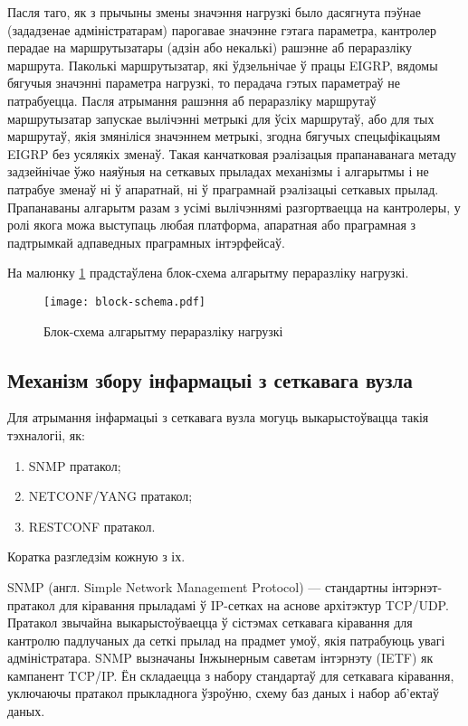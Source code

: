 Пасля таго, як з прычыны змены значэння нагрузкі было дасягнута пэўнае (зададзенае адміністратарам) парогавае значэнне гэтага параметра, кантролер перадае на маршрутызатары (адзін або некалькі) рашэнне
аб пераразліку маршрута. Паколькі маршрутызатар, які ўдзельнічае ў працы
EIGRP, вядомы бягучыя значэнні параметра нагрузкі, то перадача гэтых параметраў не патрабуецца. Пасля атрымання рашэння аб пераразліку маршрутаў
маршрутызатар запускае вылічэнні метрыкі для ўсіх маршрутаў, або для тых
маршрутаў, якія змяніліся значэннем метрыкі, згодна
бягучых спецыфікацыям EIGRP без усялякіх зменаў. Такая канчатковая рэалізацыя прапанаванага метаду задзейнічае ўжо наяўныя на сеткавых прыладах механізмы і алгарытмы і не патрабуе зменаў ні ў апаратнай, ні
ў праграмнай рэалізацыі сеткавых прылад. Прапанаваны алгарытм разам
з усімі вылічэннямі разгортваецца на кантролеры, у ролі якога можа
выступаць любая платформа, апаратная або праграмная з падтрымкай адпаведных праграмных інтэрфейсаў.

На малюнку \ref{img: block-schema} прадстаўлена блок-схема алгарытму пераразліку нагрузкі.

\clearpage

\begin{figure}[h!]
    \centering
    \texttt{[image: block-schema.pdf]}
    \caption{Блок-схема алгарытму пераразліку нагрузкі}
    \label{img: block-schema}
\end{figure}

\subsection{Механізм збору інфармацыі з сеткавага вузла}

Для атрымання інфармацыі з сеткавага вузла могуць выкарыстоўвацца такія тэхналогіі, як:
\begin{enumerate}
    \item SNMP пратакол;
    \item NETCONF/YANG пратакол;
    \item RESTCONF пратакол.
\end{enumerate}

Коратка разгледзім кожную з іх.

SNMP (англ. Simple Network Management Protocol) --- стандартны інтэрнэт-пратакол для кіравання прыладамі ў IP-сетках на аснове архітэктур TCP/UDP. Пратакол звычайна выкарыстоўваецца ў сістэмах сеткавага кіравання для кантролю падлучаных да сеткі прылад на прадмет умоў, якія патрабуюць увагі адміністратара. SNMP вызначаны Інжынерным саветам інтэрнэту (IETF) як кампанент TCP/IP. Ён складаецца з набору стандартаў для сеткавага кіравання, уключаючы пратакол прыкладнога ўзроўню, схему баз даных і набор аб'ектаў даных.


